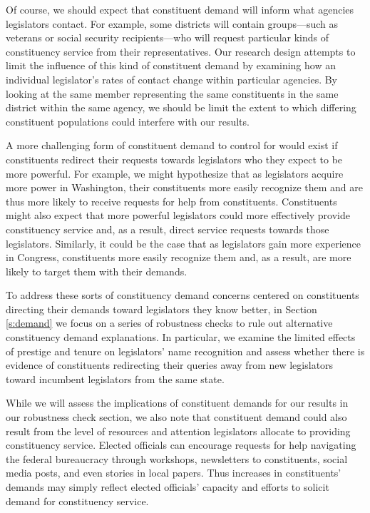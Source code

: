 \documentclass[12pt]{article}
\begin{document}
Of course, we should expect that constituent demand will inform what agencies legislators contact. For example, some districts will contain groups---such as veterans or social security recipients---who will request particular kinds of constituency service from their representatives. Our research design attempts to limit the influence of this kind of constituent demand by examining how an individual legislator's rates of contact change within particular agencies. By looking at the same member representing the same constituents in the same district within the same agency, we should be limit the extent to which differing constituent populations could interfere with our results. 

A more challenging form of constituent demand to control for would exist if constituents redirect their requests towards legislators who they expect to be more powerful. For example, we might hypothesize that as legislators acquire more power in Washington, their constituents more easily recognize them and are thus more likely to receive requests for help from constituents. Constituents might also expect that more powerful legislators could more effectively provide constituency service and, as a result, direct service requests towards those legislators. Similarly, it could be the case that as legislators gain more experience in Congress, constituents more easily recognize them and, as a result, are more likely to target them with their demands. 

To address these sorts of constituency demand concerns centered on constituents directing their demands toward legislators they know better, in Section \ref{s:demand} we focus on a series of robustness checks to rule out alternative constituency demand explanations. In particular, we examine the limited effects of prestige and tenure on legislators' name recognition and assess whether there is evidence of constituents redirecting their queries away from new legislators toward incumbent legislators from the same state. 

While we will assess the implications of constituent demands for our results in our robustness check section, we also note that constituent demand could also result from the level of resources and attention legislators allocate to providing constituency service. Elected officials can encourage requests for help navigating the federal bureaucracy through workshops, newsletters to constituents, social media posts, and even stories in local papers. Thus increases in constituents' demands may simply reflect elected officials' capacity and efforts to solicit demand for constituency service.
\end{document}
